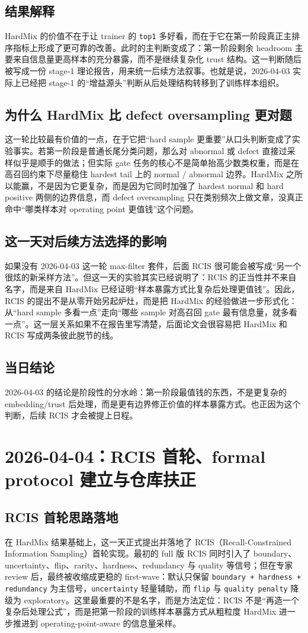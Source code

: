 \documentclass[UTF8,12pt]{ctexart}
\newcommand{\reportdate}[1]{\section{#1}}
\begin{document}
\subsection{结果解释}
HardMix 的价值不在于让 trainer 的 \texttt{top1} 多好看，而在于它在第一阶段真正主排序指标上形成了更可靠的改善。此时的主判断变成了：第一阶段剩余 headroom 主要来自信息量更高样本的充分暴露，而不是继续复杂化 trust 结构。这一判断随后被写成一份 stage-1 理论报告，用来统一后续方法叙事。也就是说，2026-04-03 实际上已经把 stage-1 的“增益源头”判断从后处理结构转移到了训练样本组织。

\subsection{为什么 HardMix 比 defect oversampling 更对题}
这一轮比较最有价值的一点，在于它把“hard sample 更重要”从口头判断变成了实验事实。若第一阶段是普通长尾分类问题，那么对 abnormal 或 defect 直接过采样似乎是顺手的做法；但实际 gate 任务的核心不是简单抬高少数类权重，而是在高召回约束下尽量稳住 hardest tail 上的 normal / abnormal 边界。HardMix 之所以能赢，不是因为它更复杂，而是因为它同时加强了 hardest normal 和 hard positive 两侧的边界信息，而 defect oversampling 只在类别频次上做文章，没真正命中“哪类样本对 operating point 更值钱”这个问题。

\subsection{这一天对后续方法选择的影响}
如果没有 2026-04-03 这一轮 max-filter 套件，后面 RCIS 很可能会被写成“另一个很炫的新采样方法”。但这一天的实验其实已经说明了：RCIS 的正当性并不来自名字，而是来自 HardMix 已经证明“样本暴露方式比复杂后处理更值钱”。因此，RCIS 的提出不是从零开始另起炉灶，而是把 HardMix 的经验做进一步形式化：从“hard sample 多看一点”走向“哪些 sample 对高召回 gate 最有信息量，就多看一点”。这一层关系如果不在报告里写清楚，后面论文会很容易把 HardMix 和 RCIS 写成两条彼此脱节的线。

\subsection{当日结论}
2026-04-03 的结论是阶段性的分水岭：第一阶段最值钱的东西，不是更复杂的 embedding/trust 后处理，而是更有边界修正价值的样本暴露方式。也正因为这个判断，后续 RCIS 才会被提上日程。

\reportdate{2026-04-04：RCIS 首轮、formal protocol 建立与仓库扶正}

\subsection{RCIS 首轮思路落地}
在 HardMix 结果基础上，这一天正式提出并落地了 RCIS（Recall-Constrained Information Sampling）首轮实现。最初的 full 版 RCIS 同时引入了 boundary、uncertainty、flip、rarity、hardness、redundancy 与 quality 等信号；但在专家 review 后，最终被收缩成更稳的 first-wave：默认只保留 \texttt{boundary + hardness + redundancy} 为主信号，\texttt{uncertainty} 轻量辅助，而 \texttt{flip} 与 \texttt{quality penalty} 降级为 exploratory。这里最重要的不是名字，而是方法定位：RCIS 不是“再造一个复杂后处理公式”，而是把第一阶段的训练样本暴露方式从粗粒度 HardMix 进一步推进到 operating-point-aware 的信息量采样。
\end{document}
